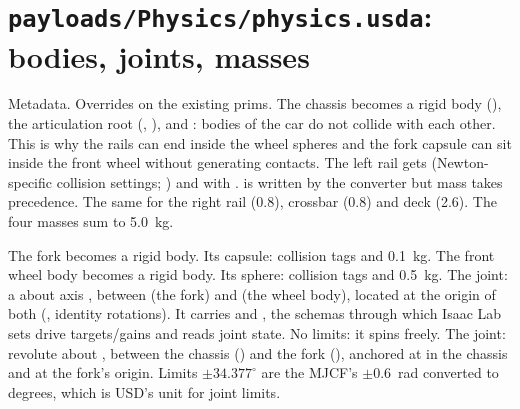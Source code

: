 \section{\texttt{payloads/Physics/physics.usda}: bodies, joints, masses}


\begin{explain}
 Metadata.
 Overrides on the existing prims.
 The chassis becomes a rigid body (),
  the articulation root (,
  ), and
  : bodies of the car do not collide
  with each other. This is why the rails can end inside the wheel spheres
  and the fork capsule can sit inside the front wheel without generating
  contacts.
 The left rail gets  (Newton-specific
  collision settings; ) and 
  with .  is written
  by the converter but mass takes precedence.
 The same for the right rail (0.8), crossbar (0.8) and deck
  (2.6). The four masses sum to 5.0~kg.
\end{explain}


\begin{explain}
 The fork becomes a rigid body.
 Its capsule: collision tags and 0.1~kg.
 The front wheel body becomes a rigid body.
 Its sphere: collision tags and 0.5~kg.
 The  joint: a 
  about axis , between  (the fork) and  (the
  wheel body), located at the origin of both (,
  identity rotations). It carries  and
  , the schemas through which Isaac Lab
  sets drive targets/gains and reads joint state. No limits: it spins
  freely.
 The  joint: revolute about , between the
  chassis () and the fork (), anchored at
   in the chassis and at the fork's
  origin. Limits $\pm34.377^\circ$ are the MJCF's $\pm0.6$~rad converted to
  degrees, which is USD's unit for joint limits.
\end{explain}


